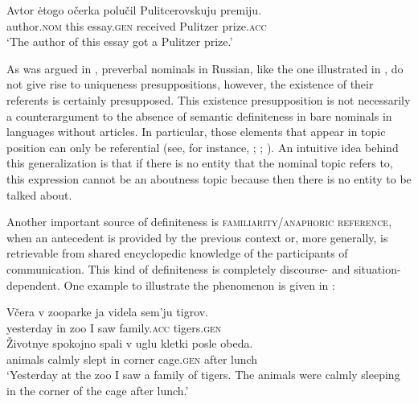 \documentclass[output=paper,
colorlinks,
citecolor=brown,
newtxmath
]{langscibook}
\begin{document}
\ea \label{ex:32}
\gll	Avtor				ėtogo		očerka		polučil		Pulitcerovskuju	premiju. \\
       	author.\textsc{nom} 	this		essay.\textsc{gen} 	received 	Pulitzer 				prize.\textsc{acc}\\
       	\glt `The author of this essay got a Pulitzer prize.'
    \z

\noindent As was argued in , preverbal nominals in Russian, like the one illustrated in , do not give rise to uniqueness presuppositions, however, the existence of their referents is certainly presupposed. This existence presupposition
is not necessarily a counterargument to the absence of semantic definiteness in bare nominals in languages without articles. In particular, those elements that appear in topic position can only be referential (see, for instance, \citealt{Reinhart1981}; \citealt{Erteschik-Shir1998}; \citealt{Endriss2009}). An intuitive idea behind this generalization is that if there is no entity that the nominal topic refers to, this expression cannot be an aboutness topic because then there is no entity to be talked about. %

Another important source of definiteness is \textsc{familiarity/anaphoric reference}, when an antecedent is provided by the previous context or, more generally, is retrievable from shared encyclopedic knowledge of the participants of communication.
This kind of definiteness is completely discourse- and situation-dependent. One example to illustrate the phenomenon is given in :

\ea \label{ex:33}
\gll	Včera			v	zooparke	ja	videla	sem'ju		tigrov.\\
	yesterday	in	zoo          	I	saw		family.\textsc{acc}	tigers.\textsc{gen}\\
	\gll Životnye	spokojno	spali	v	uglu		kletki			posle	obeda.\\
	animals		calmly      	slept	in	corner	cage.\textsc{gen} 	after	lunch\\
\glt `Yesterday at the zoo I saw a family of tigers. The animals were calmly sleeping in the corner of the cage after lunch.'
\z
\end{document}
